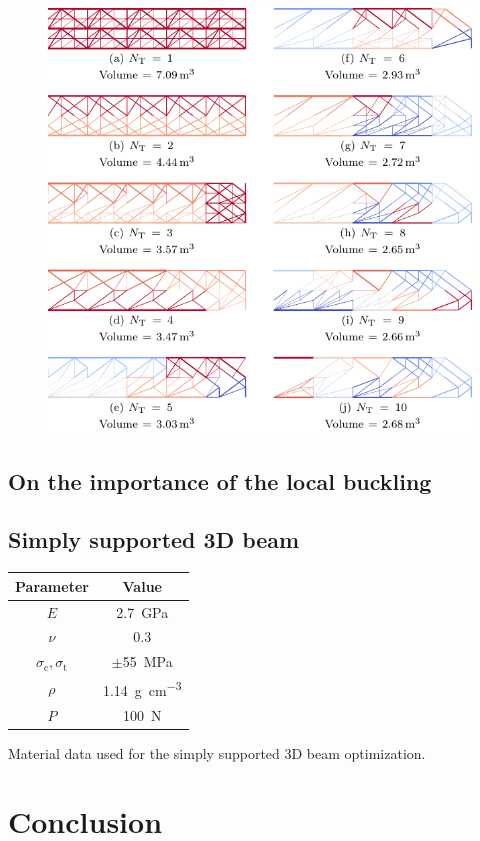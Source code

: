 \begin{figure}
    \centering
    \includegraphics{figures/06_DMO/00_tug_bench_buck/buck.pdf}
    \caption{}
    \label{fig:06}
\end{figure}

\subsection{On the importance of the local buckling}

\subsection{Simply supported 3D beam}
\begin{margintable}
    \small
    \centering
    \begin{tabular}{cc}
    \toprule
    \textbf{Parameter}        & \textbf{Value} \\ \midrule
    $E$              & \qty{2.7}{GPa}     \\
    $\nu$            & 0.3   \\
    $\sigma_\text{c}, \sigma_\text{t}$ & $\pm $\qty{55}{MPa} \\
    $\rho$              & \qty{1.14}{\gram\per\cubic\centi\metre}   \\
    $P$              & \qty{100}{N}   \\
    \bottomrule
    \end{tabular}
    \caption{Material data used for the simply supported 3D beam optimization.}
    \label{tab:06_3D_supp_mat}
\end{margintable}


\section{Conclusion}